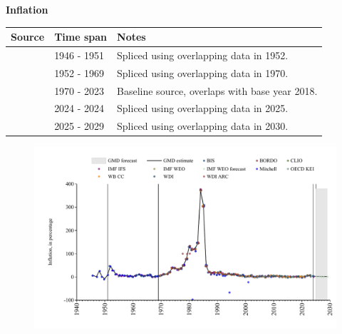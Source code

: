 \documentclass[12pt,a4paper,landscape]{article}
\begin{document}
\begin{adjustbox}{max totalsize={\paperwidth}{\paperheight},center}
\begin{minipage}[t][\textheight][t]{\textwidth}
\vspace*{0.5cm}
{}
\begin{center}
{\Large\bfseries Inflation}
\end{center}
\vspace{0.5cm}
\begin{table}[H]
\centering
\small
\begin{tabular}{|l|l|l|}
\hline
\textbf{Source} & \textbf{Time span} & \textbf{Notes} \\
\hline
\rowcolor{white}\cite{CLIO}& 1946 - 1951 &Spliced using overlapping data in 1952. \\
\rowcolor{lightgray}\cite{BIS}& 1952 - 1969 &Spliced using overlapping data in 1970. \\
\rowcolor{white}\cite{WB_CC}& 1970 - 2023 &Baseline source, overlaps with base year 2018. \\
\rowcolor{lightgray}\cite{BIS}& 2024 - 2024 &Spliced using overlapping data in 2025. \\
\rowcolor{white}\cite{IMF_WEO_forecast}& 2025 - 2029 &Spliced using overlapping data in 2030. \\
\hline
\end{tabular}
\end{table}
\begin{figure}[H]
\centering
\includegraphics[width=\textwidth,height=0.6\textheight,keepaspectratio]{graphs/ISR_infl.pdf}
\end{figure}
\end{minipage}
\end{adjustbox}
\end{document}
